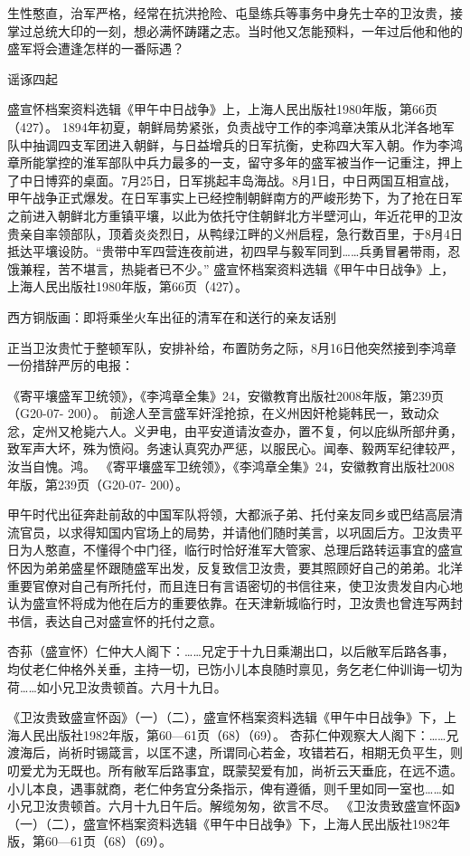 \documentclass[12pt,UTF8]{ctexbook}
\begin{document}
生性憨直，治军严格，经常在抗洪抢险、屯垦练兵等事务中身先士卒的卫汝贵，接掌过总统大印的一刻，想必满怀踌躇之志。当时他又怎能预料，一年过后他和他的盛军将会遭逢怎样的一番际遇？

谣诼四起

盛宣怀档案资料选辑《甲午中日战争》上，上海人民出版社1980年版，第66页（427）。
1894年初夏，朝鲜局势紧张，负责战守工作的李鸿章决策从北洋各地军队中抽调四支军团进入朝鲜，与日益增兵的日军抗衡，史称四大军入朝。作为李鸿章所能掌控的淮军部队中兵力最多的一支，留守多年的盛军被当作一记重注，押上了中日博弈的桌面。7月25日，日军挑起丰岛海战。8月1日，中日两国互相宣战，甲午战争正式爆发。在日军事实上已经控制朝鲜南方的严峻形势下，为了抢在日军之前进入朝鲜北方重镇平壤，以此为依托守住朝鲜北方半壁河山，年近花甲的卫汝贵亲自率领部队，顶着炎炎烈日，从鸭绿江畔的义州启程，急行数百里，于8月4日抵达平壤设防。“贵带中军四营连夜前进，初四早与毅军同到……兵勇冒暑带雨，忍饿兼程，苦不堪言，热毙者已不少。” 盛宣怀档案资料选辑《甲午中日战争》上，上海人民出版社1980年版，第66页（427）。


西方铜版画：即将乘坐火车出征的清军在和送行的亲友话别

正当卫汝贵忙于整顿军队，安排补给，布置防务之际，8月16日他突然接到李鸿章一份措辞严厉的电报：

《寄平壤盛军卫统领》，《李鸿章全集》24，安徽教育出版社2008年版，第239页（G20-07- 200）。
前途人至言盛军奸淫抢掠，在义州因奸枪毙韩民一，致动众忿，定州又枪毙六人。义尹电，由平安道请汝查办，置不复，何以庇纵所部弁勇，致军声大坏，殊为愤闷。务速认真究办严惩，以服民心。闻奉、毅两军纪律较严，汝当自愧。鸿。 《寄平壤盛军卫统领》，《李鸿章全集》24，安徽教育出版社2008年版，第239页（G20-07- 200）。

甲午时代出征奔赴前敌的中国军队将领，大都派子弟、托付亲友同乡或巴结高层清流官员，以求得知国内官场上的局势，并请他们随时美言，以巩固后方。卫汝贵平日为人憨直，不懂得个中门径，临行时恰好淮军大管家、总理后路转运事宜的盛宣怀因为弟弟盛星怀跟随盛军出发，反复致信卫汝贵，要其照顾好自己的弟弟。北洋重要官僚对自己有所托付，而且连日有言语密切的书信往来，使卫汝贵发自内心地认为盛宣怀将成为他在后方的重要依靠。在天津新城临行时，卫汝贵也曾连写两封书信，表达自己对盛宣怀的托付之意。

杏荪（盛宣怀）仁仲大人阁下：……兄定于十九日乘潮出口，以后敝军后路各事，均仗老仁仲格外关垂，主持一切，已饬小儿本良随时禀见，务乞老仁仲训诲一切为荷……如小兄卫汝贵顿首。六月十九日。

《卫汝贵致盛宣怀函》（一）（二），盛宣怀档案资料选辑《甲午中日战争》下，上海人民出版社1982年版，第60—61页（68）（69）。
杏荪仁仲观察大人阁下：……兄渡海后，尚祈时锡箴言，以匡不逮，所谓同心若金，攻错若石，相期无负平生，则叨爱尤为无既也。所有敝军后路事宜，既蒙契爱有加，尚祈云天垂庇，在远不遗。小儿本良，遇事就商，老仁仲务宜分条指示，俾有遵循，则千里如同一室也……如小兄卫汝贵顿首。六月十九日午后。解缆匆匆，欲言不尽。 《卫汝贵致盛宣怀函》（一）（二），盛宣怀档案资料选辑《甲午中日战争》下，上海人民出版社1982年版，第60—61页（68）（69）。
\end{document}
